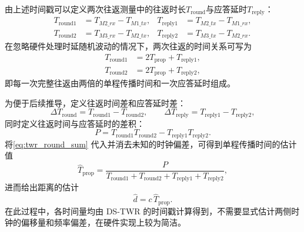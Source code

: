 由上述时间戳可以定义两次往返测量中的往返时长$T_{\mathrm{round}}$与应答延时$T_{\mathrm{reply}}$：
\begin{equation}
    \begin{aligned}
        T_{\mathrm{round}1} &= T_{M2\_rx} - T_{M1\_tx}, &
        T_{\mathrm{reply}1} &= T_{M2\_tx} - T_{M1\_rx}, \\
        T_{\mathrm{round}2} &= T_{M3\_rx} - T_{M2\_tx}, &
        T_{\mathrm{reply}2} &= T_{M3\_tx} - T_{M2\_rx}.
    \end{aligned}
    \label{eq:twr_round_reply_prop}
\end{equation}
在忽略硬件处理时延随机波动的情况下，两次往返的时间关系可写为
\begin{equation}
    \begin{aligned}
        T_{\mathrm{round}1} &= 2 T_{\mathrm{prop}} + T_{\mathrm{reply}1}, \\
        T_{\mathrm{round}2} &= 2 T_{\mathrm{prop}} + T_{\mathrm{reply}2},
    \end{aligned}
    \label{eq:twr_round_sum}
\end{equation}
即每一次完整往返由两倍的单程传播时间和一次应答延时组成。

为便于后续推导，定义往返时间差和应答延时差：
\begin{equation}
    \Delta T_{\mathrm{round}}
    = T_{\mathrm{round}1} - T_{\mathrm{round}2},\qquad
    \Delta T_{\mathrm{reply}}
    = T_{\mathrm{reply}1} - T_{\mathrm{reply}2},
    \label{eq:twr_round_minus_reply}
\end{equation}
同时定义往返时间与应答延时的差积：
\begin{equation}
    P
    =
    T_{\mathrm{round}1} T_{\mathrm{round}2}
    - T_{\mathrm{reply}1} T_{\mathrm{reply}2}.
    \label{eq:twr_round_product}
\end{equation}
将\eqref{eq:twr_round_sum} 代入并消去未知的时钟偏差，可得到单程传播时间的估计值
\begin{equation}
    \hat T_{\mathrm{prop}}
    =
    \frac{P}{T_{\mathrm{round}1} + T_{\mathrm{round}2}
             + T_{\mathrm{reply}1} + T_{\mathrm{reply}2}},
    \label{eq:Tprop_hat}
\end{equation}
进而给出距离的估计
\begin{equation}
    \hat d = c \, \hat T_{\mathrm{prop}}.
    \label{eq:Tprop_multi}
\end{equation}
在此过程中，各时间量均由 DS-TWR 的时间戳计算得到，不需要显式估计两侧时钟的偏移量和频率偏差，在硬件实现上较为简洁。

